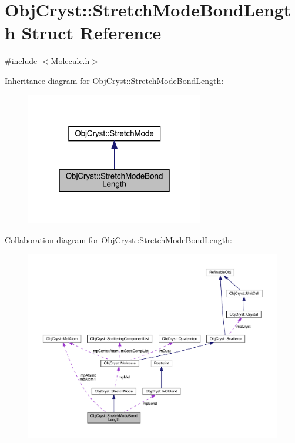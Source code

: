 \hypertarget{struct_obj_cryst_1_1_stretch_mode_bond_length}{}\section{Obj\+Cryst\+::Stretch\+Mode\+Bond\+Length Struct Reference}
\label{struct_obj_cryst_1_1_stretch_mode_bond_length}


{\ttfamily \#include $<$Molecule.\+h$>$}



Inheritance diagram for Obj\+Cryst\+::Stretch\+Mode\+Bond\+Length\+:
\nopagebreak
\begin{figure}[H]
\begin{center}
\leavevmode
\includegraphics[width=220pt]{struct_obj_cryst_1_1_stretch_mode_bond_length__inherit__graph}
\end{center}
\end{figure}


Collaboration diagram for Obj\+Cryst\+::Stretch\+Mode\+Bond\+Length\+:
\nopagebreak
\begin{figure}[H]
\begin{center}
\leavevmode
\includegraphics[width=350pt]{struct_obj_cryst_1_1_stretch_mode_bond_length__coll__graph}
\end{center}
\end{figure}
